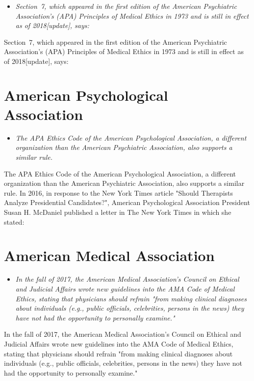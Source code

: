 \begin{itemize}
\item
  \emph{Section~7, which appeared in the first edition of the American
  Psychiatric Association's (APA) Principles of Medical Ethics in 1973
  and is still in effect as of 2018{[}update{]}, says:}
\end{itemize}

Section~7, which appeared in the first edition of the American
Psychiatric Association's (APA) Principles of Medical Ethics in 1973 and
is still in effect as of 2018{[}update{]}, says:

\section{American Psychological
Association}\label{american-psychological-association}

\begin{itemize}
\item
  \emph{The APA Ethics Code of the American Psychological Association, a
  different organization than the American Psychiatric Association, also
  supports a similar rule.}
\end{itemize}

The APA Ethics Code of the American Psychological Association, a
different organization than the American Psychiatric Association, also
supports a similar rule. In 2016, in response to the New York Times
article "Should Therapists Analyze Presidential Candidates?", American
Psychological Association President Susan H. McDaniel published a letter
in The New York Times in which she stated:

\section{American Medical
Association}\label{american-medical-association}

\begin{itemize}
\item
  \emph{In the fall of 2017, the American Medical Association's Council
  on Ethical and Judicial Affairs wrote new guidelines into the AMA Code
  of Medical Ethics, stating that physicians should refrain "from making
  clinical diagnoses about individuals (e.g., public officials,
  celebrities, persons in the news) they have not had the opportunity to
  personally examine."}
\end{itemize}

In the fall of 2017, the American Medical Association's Council on
Ethical and Judicial Affairs wrote new guidelines into the AMA Code of
Medical Ethics, stating that physicians should refrain "from making
clinical diagnoses about individuals (e.g., public officials,
celebrities, persons in the news) they have not had the opportunity to
personally examine."

